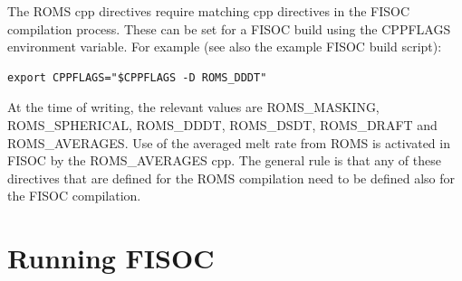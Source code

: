 \documentclass[11pt]{article}
\begin{document}
The ROMS cpp directives require matching cpp directives in the FISOC 
compilation process. 
These can be set for a FISOC build using the CPPFLAGS environment variable.
For example (see also the example FISOC build script):
\begin{lstlisting}
export CPPFLAGS="$CPPFLAGS -D ROMS_DDDT"
\end{lstlisting}
At the time of writing, the relevant values are ROMS\_MASKING, ROMS\_SPHERICAL, 
ROMS\_DDDT, ROMS\_DSDT, ROMS\_DRAFT and ROMS\_AVERAGES. Use of the averaged melt rate from ROMS is activated in FISOC by the ROMS\_AVERAGES cpp. The general rule is that any of these directives that 
are defined for the ROMS compilation need to be defined also for the FISOC 
compilation. 

















\section{Running FISOC}
\label{sec:FISOC_SUG}
\end{document}
